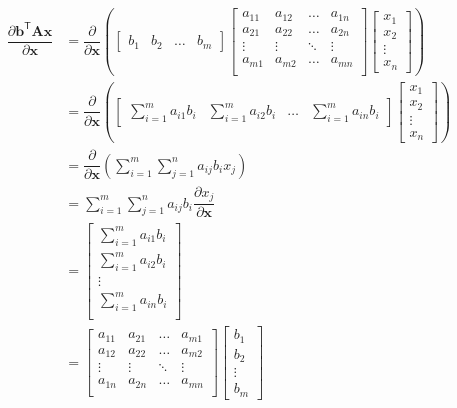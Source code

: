 \documentclass{article}
\newcommand{\trans}{\mathsf{T}}
\begin{document}
\begin{align}
    \dfrac{\partial \mathbf{b}^\trans \mathbf{A} \mathbf{x}}{\partial \mathbf{x}} &= \dfrac{\partial}{\partial \mathbf{x}} \left(
    \begin{bmatrix}
        b_{1} & b_{2} & \dots & b_{m}
    \end{bmatrix}
    \begin{bmatrix}
        a_{11} & a_{12} & \dots & a_{1n} \\
        a_{21} & a_{22} & \dots & a_{2n} \\
        \vdots & \vdots & \ddots & \vdots \\
        a_{m1} & a_{m2} & \dots & a_{mn} \\
    \end{bmatrix} \begin{bmatrix}
        x_{1} \\ x_{2} \\ \vdots \\ x_{n}
    \end{bmatrix} \right) \\
    &= \dfrac{\partial}{\partial \mathbf{x}} \left(
			\begin{bmatrix}
				\displaystyle \sum_{i = 1}^{m} a_{i1}b_{i} & 
				\displaystyle \sum_{i = 1}^{m} a_{i2}b_{i} & 
				\dots & 
				\displaystyle \sum_{i = 1}^{m} a_{in}b_{i}
			\end{bmatrix} \begin{bmatrix}
				x_{1} \\ x_{2} \\ \vdots \\ x_{n}
			\end{bmatrix} \right) \\
    &= \dfrac{\partial}{\partial \mathbf{x}} \left(
        \sum_{i = 1}^{m}\sum_{j = 1}^{n} a_{ij} b_{i} x_{j}
    \right) \\
    &= \sum_{i = 1}^{m}\sum_{j = 1}^{n} a_{ij} b_{i} \dfrac{\partial x_{j}}{\partial \mathbf{x}} \\
    &= \begin{bmatrix}
        \sum_{i = 1}^{m} a_{i1} b_{i} \\
        \sum_{i = 1}^{m} a_{i2} b_{i} \\
        \vdots \\
        \sum_{i = 1}^{m} a_{in} b_{i} \\
    \end{bmatrix} \\
    &= \begin{bmatrix}
        a_{11} & a_{21} & \dots & a_{m1} \\
        a_{12} & a_{22} & \dots & a_{m2} \\
        \vdots & \vdots & \ddots & \vdots \\
        a_{1n} & a_{2n} & \dots & a_{mn} \\
    \end{bmatrix}
    \begin{bmatrix}
        b_1 \\
        b_2 \\
        \vdots \\
        b_m
    \end{bmatrix}
\end{align}
\end{document}
